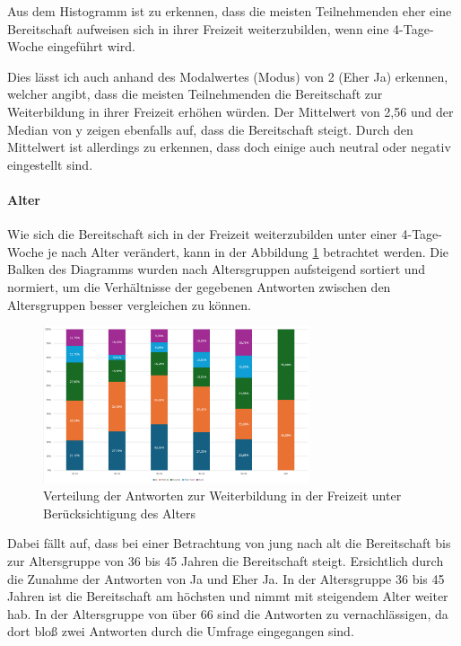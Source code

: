 Aus dem Histogramm ist zu erkennen, dass die meisten Teilnehmenden eher 
eine Bereitschaft aufweisen sich in ihrer Freizeit weiterzubilden, 
wenn eine 4-Tage-Woche eingeführt wird.

Dies lässt ich auch anhand des Modalwertes (Modus) von 2 (Eher Ja) erkennen, welcher angibt, dass die
meisten Teilnehmenden die Bereitschaft zur Weiterbildung in ihrer Freizeit erhöhen würden.
Der Mittelwert von 2,56 und der Median von y zeigen ebenfalls auf, dass die Bereitschaft steigt.
Durch den Mittelwert ist allerdings zu erkennen, dass doch einige auch neutral oder negativ 
eingestellt sind.

\paragraph*{Alter}

Wie sich die Bereitschaft sich in der Freizeit weiterzubilden unter einer 4-Tage-Woche je nach Alter verändert,
kann in der Abbildung \ref*{fig:bereitschaft_weiterbildung_alter} betrachtet werden. 
Die Balken des Diagramms wurden nach Altersgruppen aufsteigend sortiert und normiert, um die Verhältnisse
der gegebenen Antworten zwischen den Altersgruppen besser vergleichen zu können.

\begin{figure}
    \centering
    \includegraphics[width=0.7\textwidth]{04_Artefakte/01_Abbildungen/hypothese_9/weiterbildung_alter.png}
    \caption{Verteilung der Antworten zur Weiterbildung in der Freizeit unter Berücksichtigung des Alters}
    \label{fig:bereitschaft_weiterbildung_alter}
\end{figure}

Dabei fällt auf, dass bei einer Betrachtung von jung nach alt die Bereitschaft bis zur Altersgruppe von
36 bis 45 Jahren die Bereitschaft steigt. Ersichtlich durch die Zunahme der Antworten von Ja und Eher Ja.
In der Altersgruppe 36 bis 45 Jahren ist die Bereitschaft am höchsten und nimmt mit steigendem Alter
weiter hab. In der Altersgruppe von über 66 sind die Antworten zu vernachlässigen, da dort bloß
zwei Antworten durch die Umfrage eingegangen sind.

